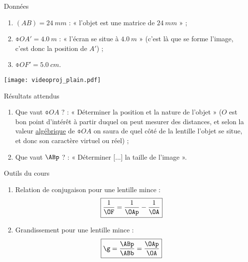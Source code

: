 \documentclass[a4paper, 12pt, final, garamond]{book}
\begin{document}
\begin{NCdefi}[sidebyside, sidebyside align=center]{Données}
    \begin{enumerate}
        \item $(AB) = \SI{24}{mm}$ : « l'objet est une matrice de $ \SI{24}{mm}$
            » ;
        \item $ \obar{OA'} = \SI{+4.0}{m}$ : « l'écran se situe à $\SI{4.0}{m}$ »
            (c'est là que se forme l'image, c'est donc la position de $A'$) ;
        \item $ \obar{OF'} = \SI{+5.0}{cm}$.
    \end{enumerate}
    \tcblower
    \begin{center}
        \texttt{[image: videoproj\_plain.pdf]}
    \end{center}
\end{NCdefi}
\begin{tcbraster}[raster columns=2, raster equal height=rows]
    \begin{NCprop}{Résultats attendus}
        \begin{enumerate}
            \item Que vaut $ \obar{OA}$ ? : « Déterminer la position et la nature de
                l'objet » ($O$ est bon point d'intérêt à partir duquel on peut
                mesurer des distances, et selon la valeur \underline{algébrique} de
                $\obar{OA}$ on saura de quel côté de la lentille l'objet se situe,
                et donc son caractère virtuel ou réel) ;
            \item Que vaut $\ABp$ ? : « Déterminer [...] la taille de l'image ».
        \end{enumerate}
    \end{NCprop}
    \begin{NCrapp}{Outils du cours}
        \begin{enumerate}
            \item Relation de conjugaison pour une lentille mince :
                \[ \boxed{ \frac{1}{\OF} = \frac{1}{\OAp} - \frac{1}{\OA}}\]
            \item Grandissement pour une lentille mince :
                \[\boxed{\g = \frac{\ABp}{\ABb} = \frac{\OAp}{\OA}}\]
        \end{enumerate}
    \end{NCrapp}
\end{tcbraster}
\end{document}
